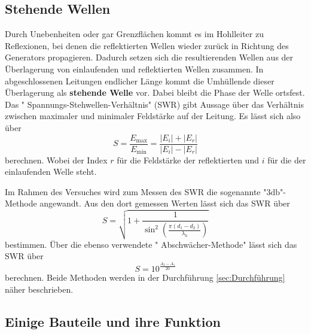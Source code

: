 \subsection{Stehende Wellen}

Durch Unebenheiten oder gar Grenzflächen kommt es im Hohlleiter zu Reflexionen, bei denen die reflektierten Wellen wieder zurück in Richtung des Generators propagieren. Dadurch setzen sich die resultierenden Wellen aus der Überlagerung von einlaufenden und reflektierten Wellen zusammen. In abgeschlossenen Leitungen endlicher Länge kommt die Umhüllende dieser Überlagerung als \textbf{stehende Welle} vor. Dabei bleibt die Phase der Welle ortsfest. Das " Spannungs-Stehwellen-Verhältnis" (SWR) gibt Aussage über das Verhältnis zwischen maximaler und minimaler Feldstärke auf der Leitung. Es lässt sich also über
\begin{equation}
    S = \frac{E_{\text{max}}}{E_{\text{min}}} = \frac{|E_i|+|E_r|}{|E_i|-|E_r|}
\end{equation}
berechnen. Wobei der Index $r$ für die Feldstärke der reflektierten und $i$ für die der einlaufenden Welle steht.


Im Rahmen des Versuches wird zum Messen des SWR die sogenannte "$3 \si{\decibel}$"- Methode angewandt. Aus den dort gemessen Werten lässt sich das SWR über
\begin{equation}
    \label{eqn:3db}
    S = \sqrt{1+\frac{1}{\sin^2\left(\frac{\pi(d_1-d_2)}{\lambda_h}\right)}}
\end{equation}
bestimmen. 
Über die ebenso verwendete " Abschwächer-Methode" lässt sich das SWR über
\begin{equation}
    \label{eqn:abschw}
    S = 10^{\frac{A_2-A_1}{20}}
\end{equation}
berechnen.
Beide Methoden werden in der Durchführung \ref{sec:Durchführung} näher beschrieben.


\subsection{Einige Bauteile und ihre Funktion}

